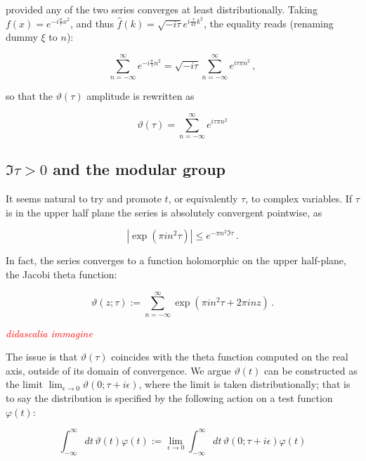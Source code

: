 \documentclass{article}
\newcommand{\T}{\ensuremath{\vartheta}}
\newcommand{\cmnt}[1]{\textcolor{red}{\emph{#1}}}
\newcommand{\intR}{\int_{-\infty}^\infty}
\newcommand{\sumZ}{\sum_{n=-\infty}^{\infty}}
\begin{document}
provided any of the two series converges at least distributionally. Taking $f(x) = e^{-i\frac{\pi}{\tau} x^2 }$, and thus $\hat f(k) = \sqrt{-i\tau} e^{i \frac{\tau}{4\pi} k^2}$, the equality reads (renaming dummy $\xi$ to $n$):

\begin{equation}
    \sumZ e^{-i\frac{\pi}{\tau} n^2 } = \sqrt{-i\tau} \sumZ e^{i\tau\pi n^2} \,,
\end{equation}

so that the $\T(\tau)$ amplitude is rewritten as

\begin{equation}
    \T(\tau) = \sumZ e^{i\tau\pi n^2}
\end{equation}

\subsection{$\Im{\tau}>0$ and the modular group} \label{sec:modular}

It seems natural to try and promote $t$, or equivalently $\tau$, to complex variables. If $\tau$ is in the upper half plane the series is absolutely convergent pointwise, as

\begin{equation}
    | \exp(\pi i n^2 \tau) | \leq e^{-\pi n^2 \Im\tau}\,.
\end{equation}

In fact, the series converges to a function holomorphic on the upper half-plane, the Jacobi theta function:

\begin{equation}\label{jacobidef}
\vartheta(z;\tau) := \sumZ \exp( \pi i n^2 \tau + 2\pi i n z )\,.
\end{equation}



\cmnt{didascalia immagine}

The issue is that $\T(\tau)$ coincides with the theta function computed on the real axis, outside of its domain of convergence. We argue $\T(t)$ can be constructed as the limit $\lim_{\epsilon\rightarrow 0} \vartheta(0;\tau + i\epsilon)$, where the limit is taken distributionally; that is to say the distribution is specified by the following action on a test function $\varphi(t)$:

\begin{equation}
    \intR dt \, \T(t) \varphi(t)  := \lim_{\epsilon\rightarrow 0} \intR dt \, \vartheta(0; \tau + i \epsilon) \varphi(t)
\end{equation}
\end{document}
